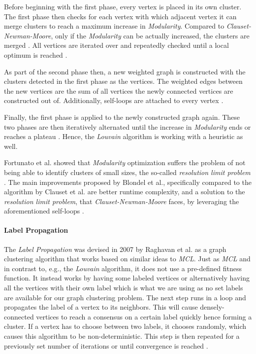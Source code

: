 \documentclass[12pt,a4paper]{report}
\begin{document}
Before beginning with the first phase, every vertex is placed in its own
cluster. The first phase then checks for each vertex with which adjacent vertex
it can merge clusters to reach a maximum increase in \textit{Modularity}.
Compared to \textit{Clauset-Newman-Moore}, only if the \textit{Modularity} can
be actually increased, the clusters are merged \cite{blondel2008modularity}.
All vertices are iterated over and repeatedly checked until a local optimum is
reached \cite{blondel2008modularity}.

As part of the second phase then, a new weighted graph is constructed with the
clusters detected in the first phase as the vertices. The weighted edges
between the new vertices are the sum of all vertices the newly connected
vertices are constructed out of. Additionally, self-loops are attached to every
vertex \cite{blondel2008modularity}.

Finally, the first phase is applied to the newly constructed graph again. These
two phases are then iteratively alternated until the increase in
\textit{Modularity} ends or reaches a plateau \cite{blondel2008modularity}.
Hence, the \textit{Louvain} algorithm is working with a heuristic as well.

Fortunato et al. showed that \textit{Modularity} optimization suffers the
problem of not being able to identify clusters of small sizes, the so-called
\textit{resolution limit problem} \cite{fortunato2007resolution}. The main
improvements proposed by Blondel et al., specifically compared to the algorithm
by Clauset et al. are better runtime complexity, and a solution to the
\textit{resolution limit problem}, that \textit{Clauset-Newman-Moore} faces,
by leveraging the aforementioned self-loops \cite{blondel2008modularity}.

\paragraph{Label Propagation \cite{raghavan2007lpa}}
The \textit{Label Propagation} was devised in 2007 by Raghavan et al.
as a graph clustering algorithm that works based on similar ideas to \textit{MCL}.
Just as \textit{MCL} and in contrast to, e.g., the \textit{Louvain} algorithm,
it does not use a pre\hyp defined fitness function.
It instead works by having some labeled
vertices or alternatively having all the vertices with their own label which is
what we are using as no set labels are available for our graph clustering
problem. The next step runs in a loop and propagates the label of a vertex to
its neighbors. This will cause densely\hyp connected vertices to reach a
consensus on a certain label quickly hence forming a cluster. If a vertex has
to choose between two labels, it chooses randomly, which causes this algorithm
to be non\hyp deterministic. This step is then repeated for a previously set
number of iterations or until convergence is reached \cite{raghavan2007lpa}.
\end{document}

